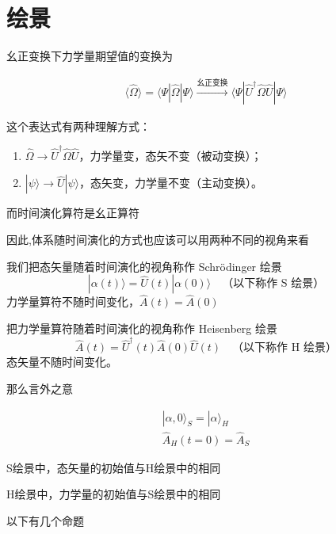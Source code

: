 \documentclass[lang=cn,15pt]{elegantbook}
\begin{document}
\section{绘景}
幺正变换下力学量期望值的变换为

\begin{align*}
	\langle \hat{\Omega} \rangle = \langle \Psi | \hat{\Omega} | \Psi \rangle \xrightarrow{\text{幺正变换}} \langle \Psi | \hat{U}^\dagger \hat{\Omega} \hat{U} | \Psi \rangle
\end{align*}

这个表达式有两种理解方式：
\begin{enumerate}
	\item $\hat{\Omega} \longrightarrow \hat{U}^\dagger \hat{\Omega} \hat{U}$，力学量变，态矢不变（被动变换）；
	\item $|\psi\rangle \longrightarrow \hat{U} |\psi\rangle$，态矢变，力学量不变（主动变换）。
\end{enumerate}

而时间演化算符是幺正算符

因此,体系随时间演化的方式也应该可以用两种不同的视角来看

我们把态矢量随着时间演化的视角称作 Schrödinger 绘景
\[ |\alpha(t)\rangle = \hat{U}(t) |\alpha(0)\rangle \quad \text{（以下称作 S 绘景）} \]
力学量算符不随时间变化，\( \hat{A}(t) = \hat{A}(0) \)

把力学量算符随着时间演化的视角称作 Heisenberg 绘景
\[ \hat{A}(t) = \hat{U}^\dagger(t) \hat{A}(0) \hat{U}(t) \quad \text{（以下称作 H 绘景）} \]
态矢量不随时间变化。

那么言外之意

\begin{align*}
	|\alpha, 0\rangle_{S} = |\alpha\rangle_{H} \\
	\hat{A}_{H}(t=0) = \hat{A}_{S}
\end{align*}

S绘景中，态矢量的初始值与H绘景中的相同


H绘景中，力学量的初始值与S绘景中的相同

以下有几个命题
\end{document}
